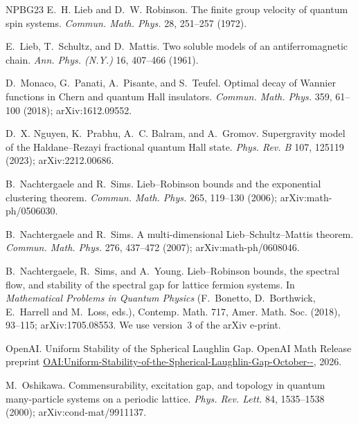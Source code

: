 \begin{thebibliography}{NPBG23}
E.~H. Lieb and D.~W. Robinson.
\newblock The finite group velocity of quantum spin systems.
\newblock \emph{Commun. Math. Phys.} 28, 251--257 (1972).

E.~Lieb, T.~Schultz, and D.~Mattis.
\newblock Two soluble models of an antiferromagnetic chain.
\newblock \emph{Ann. Phys. (N.Y.)} 16, 407--466 (1961).

D.~Monaco, G.~Panati, A.~Pisante, and S.~Teufel.
\newblock Optimal decay of Wannier functions in Chern and quantum Hall insulators.
\newblock \emph{Commun. Math. Phys.} 359, 61--100 (2018); arXiv:1612.09552.

D.~X. Nguyen, K.~Prabhu, A.~C. Balram, and A.~Gromov.
\newblock Supergravity model of the Haldane--Rezayi fractional quantum Hall state.
\newblock \emph{Phys. Rev. B} 107, 125119 (2023); arXiv:2212.00686.

B.~Nachtergaele and R.~Sims.
\newblock Lieb--Robinson bounds and the exponential clustering theorem.
\newblock \emph{Commun. Math. Phys.} 265, 119--130 (2006); arXiv:math-ph/0506030.

B.~Nachtergaele and R.~Sims.
\newblock A multi-dimensional Lieb--Schultz--Mattis theorem.
\newblock \emph{Commun. Math. Phys.} 276, 437--472 (2007); arXiv:math-ph/0608046.

B.~Nachtergaele, R.~Sims, and A.~Young.
\newblock Lieb--Robinson bounds, the spectral flow, and stability of the spectral gap for lattice fermion
systems.
\newblock In \emph{Mathematical Problems in Quantum Physics} (F.~Bonetto, D.~Borthwick, E.~Harrell and M.~Loss,
eds.), Contemp. Math. 717, Amer. Math. Soc. (2018), 93--115; arXiv:1705.08553. We use version~3 of the arXiv
e-print.

OpenAI.
\newblock Uniform Stability of the Spherical Laughlin Gap.
\newblock OpenAI Math Release preprint
\href{https://github.com/openai/math/blob/main/preprints/Uniform-Stability-of-the-Spherical-Laughlin-Gap-October-5-2026/uniform-stability-spherical-laughlin-gap.pdf}{OAI:\allowbreak Uniform-\allowbreak Stability-\allowbreak of-\allowbreak the-\allowbreak Spherical-\allowbreak Laughlin-\allowbreak Gap-\allowbreak October--},
2026.

M.~Oshikawa.
\newblock Commensurability, excitation gap, and topology in quantum many-particle systems on a periodic lattice.
\newblock \emph{Phys. Rev. Lett.} 84, 1535--1538 (2000); arXiv:cond-mat/9911137.


\end{thebibliography}
